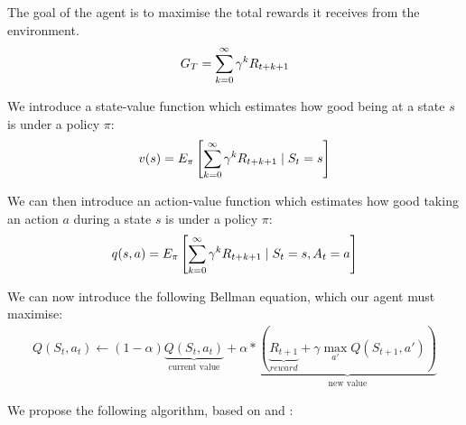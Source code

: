 \documentclass[12pt]{article}
\begin{document}
The goal of the agent is to maximise the total rewards it receives from the environment\cite{reinforcementlearningintro}.
\begin{align}
  G_T = \sum_{\mathclap{k=0}}^{\infty} \gamma^{k} R_{t+k+1}
\end{align}

We introduce a state-value function  which estimates how good being at a state $s$ is under a policy $\pi$:
\begin{align}
  v(s) = E_{\pi}\left[\sum_{\mathclap{k=0}}^{\infty}\gamma^{k} R_{t+k+1} \mid S_t = s\right]
\end{align}

We can then introduce an action-value function which estimates how good taking an action $a$ during a state $s$ is under a policy $\pi$:
\begin{align}
  q(s, a) = E_{\pi}\left[\sum_{\mathclap{k=0}}^{\infty}\gamma^{k} R_{t+k+1} \mid S_t = s, A_t = a\right]
\end{align}

We can now introduce the following Bellman equation, which our agent must maximise:
\begin{align}\label{eqopt}
  Q(S_t, a_t) \gets (1 - \alpha) \underbrace{Q(S_t, a_t)}_{\text{current value}} + \alpha * \underbrace{(\underbrace{R_{t+1}}_{reward} + \gamma \max_{a'}{Q(S_{t+1}, a')})}_{\text{new value}}
\end{align}

We propose the following algorithm, based on \cite[p.~67--72]{AICourse13} and \cite{qlearningalgo}:
\end{document}
